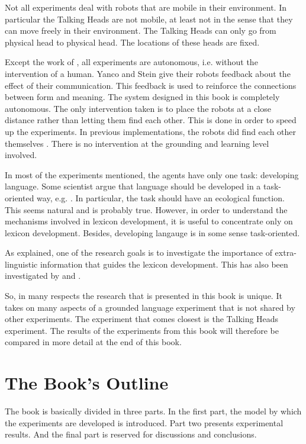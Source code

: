 Not all experiments deal with robots that are mobile in their environment. In particular the Talking Heads are not mobile, at least not in the sense that they can move freely in their environment. The Talking Heads can only go from physical head to physical head. The locations of these heads are fixed. 

Except the work of \citet{yancostein}, all experiments are autonomous, i.e. without the intervention of a human. Yanco and Stein give their robots feedback about the effect of their communication. This feedback is used to reinforce the connections between form and meaning. The system designed in this book is completely autonomous. The only intervention taken is to place the robots at a close distance rather than letting them find each other. This is done in order to speed up the experiments. In previous implementations, the robots did find each other themselves \citep{steelsvogt:1997}. There is no intervention at the grounding and learning level involved.

In most of the experiments mentioned, the agents have only one task: developing language. Some scientist argue that language should be developed in a task-oriented way, e.g. \citep{billard:1997a,cangelosiparisi:1998,dejong:2000,yancostein}. In particular, the task should have an ecological function. This seems natural and is probably true. However, in order to understand the mechanisms involved in lexicon development, it is useful to concentrate only on lexicon development. Besides, developing langauge is in some sense task-oriented.

As explained, one of the research goals is to investigate the importance of extra-linguistic information that guides the lexicon development. This has also been investigated by \citet{oliphant:1997} and \citet{dejong:2000}.

So, in many respects the research that is presented in this book is unique. It takes on many aspects of a grounded language experiment that is not shared by other experiments. The experiment that comes closest is the Talking Heads experiment. The results of the experiments from this book will therefore be compared in more detail at the end of this book.


\section{The Book's Outline}

The book is basically divided in three parts. In the first part, the model by which the experiments are developed is introduced. Part two presents experimental results. And the final part is reserved for discussions and conclusions.



